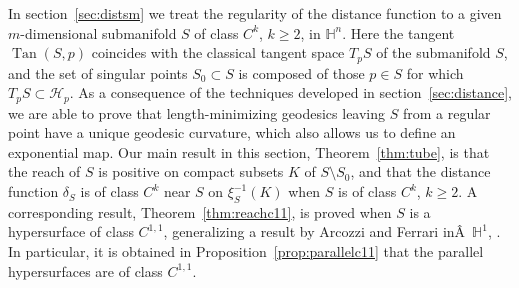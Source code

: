 \documentclass[10pt]{amsart}
\theoremstyle{definition}
\theoremstyle{remark}
\numberwithin{equation}{section}
\begin{document}
In section~\ref{sec:distsm} we treat the regularity of the distance function to a given $m$-dimen\-sional submanifold $S$ of class $C^k$, $k{\geqslant} 2$, in ${{\mathbb{H}}}^n$. Here the tangent $\operatorname{Tan}(S,p)$ coincides with the classical tangent space $T_pS$ of the submanifold $S$, and the set of singular points $S_0\subset S$ is composed of those $p\in S$ for which $T_pS\subset{\mathcal{H}}_p$. As a consequence of the techniques developed in section~\ref{sec:distance}, we are able to prove that length-minimizing geodesics leaving $S$ from a regular point have a unique geodesic curvature, which also allows us to define an exponential map. Our main result in this section, Theorem~\ref{thm:tube}, is that the reach of $S$ is positive on compact subsets $K$ of $S\setminus S_0$, and that the distance function $\delta_S$ is of class $C^k$ near $S$ on $\xi^{-1}_S(K)$ when $S$ is of class $C^k$, $k{\geqslant} 2$. A corresponding result, Theorem~\ref{thm:reachc11}, is proved when $S$ is a hypersurface of class $C^{1,1}$, generalizing a result by Arcozzi and Ferrari inÂ ${{\mathbb{H}}}^1$, \cite{MR2299576}. In particular, it is obtained in Proposition~\ref{prop:parallelc11} that the parallel hypersurfaces are of class $C^{1,1}$.
\end{document}
